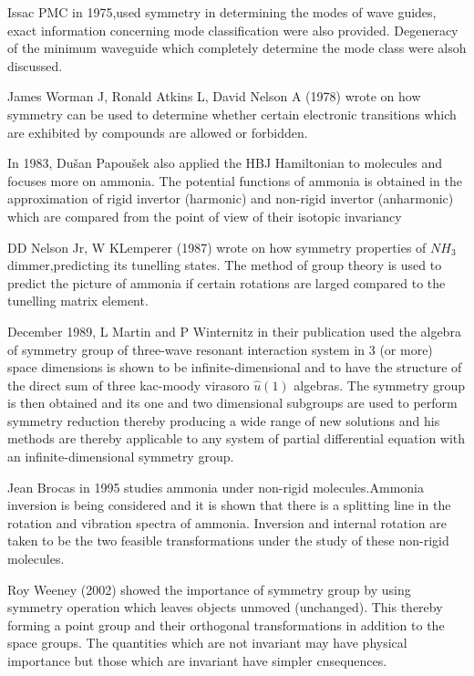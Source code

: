 \documentclass[a4paper, 12pt, openany]{report}
\begin{document}
	Issac PMC in 1975,used symmetry in determining the modes of wave guides, exact information concerning mode classification were also provided. Degeneracy of the minimum waveguide which completely determine the mode class were alsoh discussed.
	
	James Worman J, Ronald Atkins L, David Nelson A (1978) wrote on how symmetry can be used to determine whether certain electronic transitions which are exhibited by compounds are allowed or forbidden.
	
	In 1983, Dušan Papoušek also applied the HBJ Hamiltonian to molecules and focuses more on ammonia. The potential functions of ammonia is \break obtained in the approximation of rigid invertor (harmonic) and non-rigid invertor (anharmonic) which are compared from the point of view of their isotopic invariancy 
	
	DD Nelson Jr, W KLemperer (1987) wrote on how symmetry properties of $NH_3$ dimmer,predicting its tunelling states. The method of group theory is used to predict the picture of ammonia if certain rotations are larged compared to the tunelling matrix element.
	
	December 1989, L Martin and P Winternitz in their publication used the algebra of symmetry group of three-wave resonant interaction system in $3$ (or more) space dimensions is shown to be infinite-dimensional and to have the structure of the direct sum of three kac-moody virasoro $\hat{u}(1)$ algebras. The symmetry group is then obtained and its one and two dimensional subgroups are used to perform symmetry reduction thereby producing a wide range of new solutions and his methods are thereby applicable to any system of partial differential equation with an infinite-dimensional symmetry group. 
	
	Jean Brocas in 1995 studies ammonia under non-rigid molecules.Ammonia inversion is being considered and it is shown that there is a splitting line in the rotation and vibration spectra of ammonia. Inversion and internal \break rotation are taken to be the two feasible transformations under the study of these non-rigid molecules.
	
	Roy Weeney (2002) showed the importance of symmetry group by using \linebreak symmetry operation which leaves objects unmoved (unchanged). This thereby forming a point group and their orthogonal transformations in addition to the space groups. The quantities which are not invariant may have physical importance but those which are invariant have simpler cnsequences.
	
\end{document}
